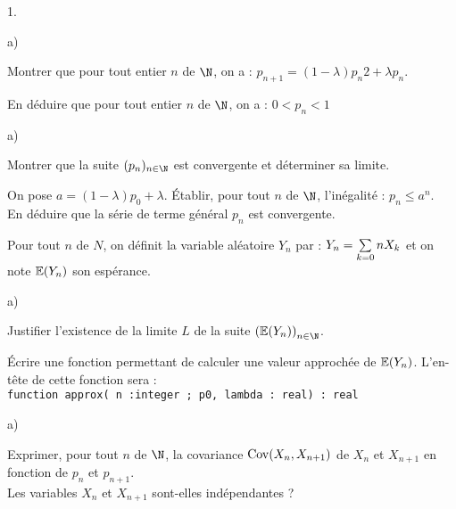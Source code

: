 \documentclass[11pt]{article}%
\begin{document}
\begin{noliste}{1.}
 \setlength{\itemsep}{4mm}
\item 

\begin{noliste}{a)}
 \setlength{\itemsep}{2mm}
\item Montrer que pour tout entier $n$ de $\N$, on a : \qquad $p_{n +
1} = (1-\lambda )p_{n}{2} + \lambda p_{n}$.

\item En déduire que pour tout entier $n$ de $\N$, on a : \qquad
$0<p_{n}<1$
\end{noliste}

\item 

\begin{noliste}{a)}
 \setlength{\itemsep}{2mm}
\item Montrer que la suite $(p_{n})_{n\in \N}$ est convergente et
déterminer sa limite.

\item On pose $a = (1-\lambda )p_{0} + \lambda $. Établir, pour tout
$n$ de $\N$, l'inégalité : \qquad $p_{n}\leq a^{n}$.\\
En déduire que la série de terme général $p_{n}$ est convergente.
\end{noliste}

\item Pour tout $n$ de $N$, on définit la variable aléatoire $Y_{n}$
par :
\quad $Y_{n} = \sum\limits_{k = 0}{n}X_{k}$ \quad et on note
$\mathbb{E}(Y_{n})$ son espérance.

\begin{noliste}{a)}
 \setlength{\itemsep}{2mm}
\item Justifier l'existence de la limite $L$ de la suite $\left(
\E(Y_{n})\right)_{n\in \N}$.

\item Écrire une fonction \Scilab{} permettant de calculer une valeur
approchée
de $\mathbb{E}(Y_{n})$. L'en-tête de cette fonction sera : \\
\texttt{function approx( n :integer ; p0, lambda : real) : real}
\end{noliste}

\item 

\begin{noliste}{a)}
 \setlength{\itemsep}{2mm}
\item Exprimer, pour tout $n$ de $\N$, la covariance ${\rm{Cov}}(X_{n},X_{n +
1})$ de $X_{n}$ et $X_{n + 1}$ en fonction de $p_{n}$ et $p_{n + 1}$.
\\
Les variables $X_{n}$ et $X_{n + 1}$ sont-elles indépendantes ?


\end{noliste}
\end{noliste}
\end{document}
